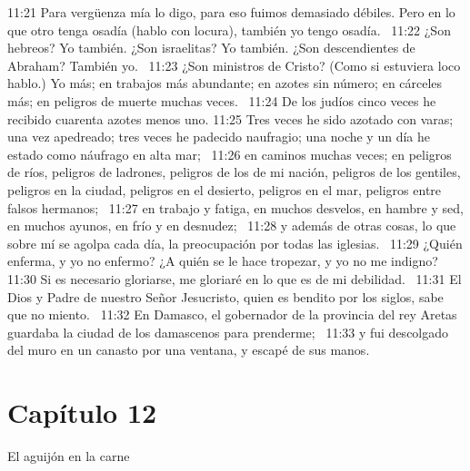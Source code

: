 11:21 Para vergüenza mía lo digo, para eso fuimos demasiado débiles. Pero en lo que otro tenga osadía (hablo con locura), también yo tengo osadía.  
11:22 ¿Son hebreos? Yo también. ¿Son israelitas? Yo también. ¿Son descendientes de Abraham? También yo.  
11:23 ¿Son ministros de Cristo? (Como si estuviera loco hablo.) Yo más; en trabajos más abundante; en azotes sin número; en cárceles más; en peligros de muerte muchas veces.  
11:24 De los judíos cinco veces he recibido cuarenta azotes menos uno. 
11:25 Tres veces he sido azotado con varas; una vez apedreado; tres veces he padecido naufragio; una noche y un día he estado como náufrago en alta mar;  
11:26 en caminos muchas veces; en peligros de ríos, peligros de ladrones, peligros de los de mi nación, peligros de los gentiles, peligros en la ciudad, peligros en el desierto, peligros en el mar, peligros entre falsos hermanos;  
11:27 en trabajo y fatiga, en muchos desvelos, en hambre y sed, en muchos ayunos, en frío y en desnudez;  
11:28 y además de otras cosas, lo que sobre mí se agolpa cada día, la preocupación por todas las iglesias.  
11:29 ¿Quién enferma, y yo no enfermo? ¿A quién se le hace tropezar, y yo no me indigno?  
11:30 Si es necesario gloriarse, me gloriaré en lo que es de mi debilidad.  
11:31 El Dios y Padre de nuestro Señor Jesucristo, quien es bendito por los siglos, sabe que no miento.  
11:32 En Damasco, el gobernador de la provincia del rey Aretas guardaba la ciudad de los damascenos para prenderme;  
11:33 y fui descolgado del muro en un canasto por una ventana, y escapé de sus manos. 
\section*{Capítulo 12}
El aguijón en la carne  

